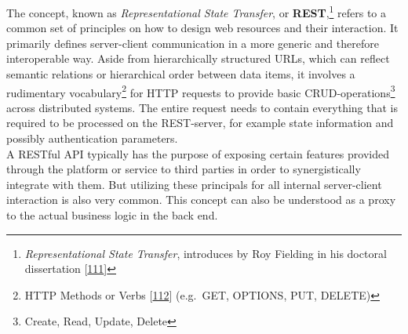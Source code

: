\documentclass[12pt,english,a4paper,titlepage,cleardoublepage=empty,dottedtoc]{report}
\begin{document}
The concept, known as \emph{Representational State Transfer}, or
\textbf{REST},\footnote{\emph{Representational State Transfer},
  introduces by Roy Fielding in his doctoral dissertation
  {[}\protect\hyperlink{ref-web_spec_rest}{111}{]}} refers to a common
set of principles on how to design web resources and their interaction.
It primarily defines server-client communication in a more generic and
therefore interoperable way. Aside from hierarchically structured URLs,
which can reflect semantic relations or hierarchical order between data
items, it involves a rudimentary vocabulary\footnote{HTTP Methods or
  Verbs {[}\protect\hyperlink{ref-web_spec_http-methods}{112}{]}
  (e.g.~GET, OPTIONS, PUT, DELETE)} for HTTP requests to provide basic
CRUD-operations\footnote{Create, Read, Update, Delete} across
distributed systems. The entire request needs to contain everything that
is required to be processed on the REST-server, for example state
information and possibly authentication parameters.\\
A RESTful API typically has the purpose of exposing certain features
provided through the platform or service to third parties in order to
synergistically integrate with them. But utilizing these principals for
all internal server-client interaction is also very common. This concept
can also be understood as a proxy to the actual business logic in the
back end.
\end{document}
